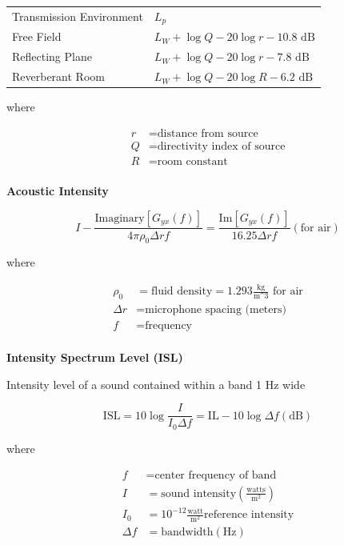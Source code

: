 \documentclass[
]{book}
\begin{document}
\begin{longtable}[]{@{}ll@{}}
\toprule
\endhead
Transmission Environment & \(L_p\)\tabularnewline
Free Field & \(L_W + \log Q - 20 \log r - 10.8 \text{ dB}\)\tabularnewline
Reflecting Plane & \(L_W + \log Q - 20 \log r - 7.8 \text{ dB}\)\tabularnewline
Reverberant Room & \(L_W + \log Q - 20 \log R - 6.2 \text{ dB}\)\tabularnewline
\bottomrule
\end{longtable}

where

\begin{align}
r &= \text{distance from source}\\
Q &= \text{directivity index of source}\\
R &= \text{room constant}\\
\end{align}

\textbf{Acoustic Intensity}

\[
I - \frac{\text{Imaginary} \left[ G_{yx} \left( f \right) \right]}{4 \pi \rho_0 \Delta r f} = \frac{\text{Im} \left[ G_{yx} \left( f \right) \right]}{16.25 \Delta r f} \left( \text{for air} \right)
\]

where

\begin{align}
\rho_0 &= \text{fluid density} = 1.293 \frac{\text{kg}}{\text{m^3}} \text{ for air}\\
\Delta r &= \text{microphone spacing (meters)}\\
f &= \text{frequency}\\
\end{align}

\textbf{Intensity Spectrum Level (ISL)}

Intensity level of a sound contained within a band 1 \(\text{Hz}\) wide

\[
\mathrm{ISL} = 10 \log \frac{I}{I_0 \Delta f} = \mathrm{IL} - 10 \log \Delta f \left( \text{dB} \right)
\]

where

\begin{align}
f &= \text{center frequency of band} \\
I &= \text{sound intensity} \left( \frac{\text{watts}}{\text{m}^2} \right) \\
I_0 &= 10^{-12} \frac{\text{watt}}{\text{m}^2} \text{reference intensity} \\
\Delta f &= \text{bandwidth} \left( \text{Hz} \right) \\
\end{align}
\end{document}
